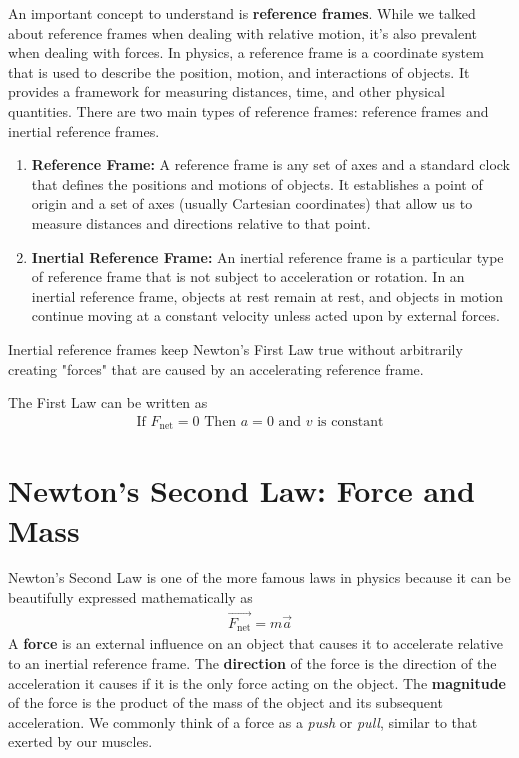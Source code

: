 \documentclass[11pt]{article}
\begin{document}
An important concept to understand is \textbf{reference frames}. While we talked about reference frames when dealing with relative motion, it's also prevalent when dealing with forces. In physics, a reference frame is a coordinate system that is used to describe the position, motion, and interactions of objects. It provides a framework for measuring distances, time, and other physical quantities. There are two main types of reference frames: reference frames and inertial reference frames.
\begin{enumerate}
    \item \textbf{Reference Frame:}\newline
    A reference frame is any set of axes and a standard clock that defines the positions and motions of objects. It establishes a point of origin and a set of axes (usually Cartesian coordinates) that allow us to measure distances and directions relative to that point.
    \item \textbf{Inertial Reference Frame:}\newline
    An inertial reference frame is a particular type of reference frame that is not subject to acceleration or rotation. In an inertial reference frame, objects at rest remain at rest, and objects in motion continue moving at a constant velocity unless acted upon by external forces.
\end{enumerate}

Inertial reference frames keep Newton's First Law true without arbitrarily creating "forces" that are caused by an accelerating reference frame.

The First Law can be written as
\begin{align*}
    \text{If } F_{\text{net}} = 0 \text{ Then } a = 0 \text{ and } v \text{ is constant}
\end{align*}

\section{Newton's Second Law: Force and Mass}

Newton's Second Law is one of the more famous laws in physics because it can be beautifully expressed mathematically as
\begin{align*}
    \Vec{F_{\text{net}}} = m\Vec{a}
\end{align*}
A \textbf{force} is an external influence on an object that causes it to accelerate relative to an inertial reference frame. The \textbf{direction} of the force is the direction of the acceleration it causes if it is the only force acting on the object. The \textbf{magnitude} of the force is the product of the mass of the object and its subsequent acceleration. We commonly think of a force as a \textit{push} or \textit{pull}, similar to that exerted by our muscles.
\end{document}
